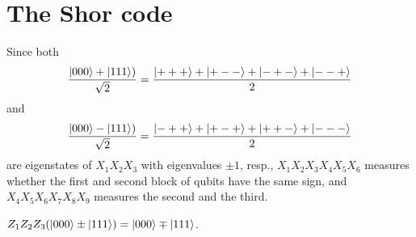 \section{The Shor code}

\ex Since both 
$$
\frac{\left|000\right\rangle+\left|111\right\rangle)}{\sqrt{2}} = \frac{\left|+++\right\rangle+\left|+--\right\rangle+\left|-+-\right\rangle+\left|--+\right\rangle}{2}
$$
and
$$
\frac{\left|000\right\rangle-\left|111\right\rangle)}{\sqrt{2}} = \frac{\left|-++\right\rangle+\left|+-+\right\rangle+\left|++-\right\rangle+\left|---\right\rangle}{2}
$$
are eigenstates of $X_1X_2X_3$ with eigenvalues $\pm 1$, resp., $X_1X_2X_3X_4X_5X_6$ measures whether the first and second block of qubits have the same sign, and $X_4X_5X_6X_7X_8X_9$ measures the second and the third.

\ex $Z_1Z_2Z_3(\left|000\right\rangle\pm\left|111\right\rangle) = \left|000\right\rangle\mp\left|111\right\rangle$.